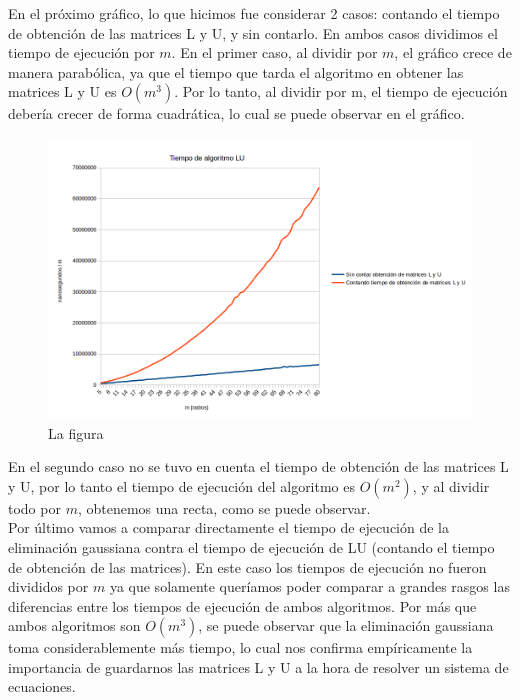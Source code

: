 En el próximo gráfico, lo que hicimos fue considerar 2 casos: contando el tiempo de obtención de las matrices L y U, y sin contarlo. En ambos casos dividimos el tiempo de ejecución por $m$. En el primer caso, al dividir por $m$, el gráfico crece de manera parabólica, ya que el tiempo que tarda el algoritmo en obtener las matrices L y U es $O(m^{3})$. Por lo tanto, al dividir por m, el tiempo de ejecución debería crecer de forma cuadrática, lo cual se puede observar en el gráfico. 


\begin{figure}[h]
  \center
  \includegraphics[scale=0.6]{imagenes/tiempoLUdivididoM.png}
  \caption{La figura}
  \label{fig:ludivididom}
\end{figure}


En el segundo caso no se tuvo en cuenta el tiempo de obtención de las matrices L y U, por lo tanto el tiempo de ejecución del algoritmo es $O(m^{2})$, y al dividir todo por $m$, obtenemos una recta, como se puede observar. \\


Por último vamos a comparar directamente el tiempo de ejecución de la eliminación gaussiana contra el tiempo de ejecución de LU (contando el tiempo de obtención de las matrices). En este caso los tiempos de ejecución no fueron divididos por $m$ ya que solamente queríamos poder comparar a grandes rasgos las diferencias entre los tiempos de ejecución de ambos algoritmos. Por más que ambos algoritmos son $O(m^{3})$, se puede observar que la eliminación gaussiana toma considerablemente más tiempo, lo cual nos confirma empíricamente la importancia de guardarnos las matrices L y U a la hora de resolver un sistema de ecuaciones.

